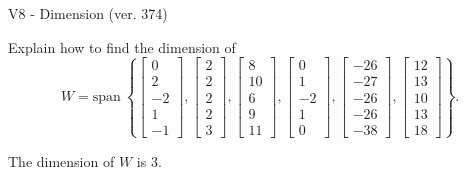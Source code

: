 \begin{exercise}
  \begin{exerciseTitle}V8 - Dimension (ver. 374)\end{exerciseTitle}
  \begin{exerciseStatement}
    Explain how to find the dimension of 
\[W=\mathrm{span}\ \left\{\left[\begin{array}{r}
0 \\
2 \\
-2 \\
1 \\
-1
\end{array}\right] , \left[\begin{array}{r}
2 \\
2 \\
2 \\
2 \\
3
\end{array}\right] , \left[\begin{array}{r}
8 \\
10 \\
6 \\
9 \\
11
\end{array}\right] , \left[\begin{array}{r}
0 \\
1 \\
-2 \\
1 \\
0
\end{array}\right] , \left[\begin{array}{r}
-26 \\
-27 \\
-26 \\
-26 \\
-38
\end{array}\right] , \left[\begin{array}{r}
12 \\
13 \\
10 \\
13 \\
18
\end{array}\right]\right\}.\]



  \end{exerciseStatement}
  \begin{exerciseAnswer}
   The dimension of \(W\) is  \(3\).
  


  \end{exerciseAnswer}
\end{exercise}